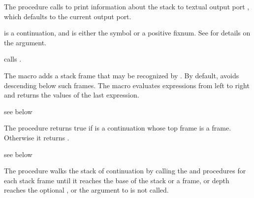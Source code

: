 The  procedure calls  to print information
about the stack to textual output port , which defaults to the current
output port.

 is a continuation, and  is either the symbol
 or a positive fixnum.
See \hyperlink{walk-stack}{} for details on the
 argument.

 calls .

\begin{syntax}
\end{syntax}
\expandsto{}

The  macro adds a stack frame that may be recognized
by .
By default,  avoids descending below such frames.
The  macro evaluates expressions   \etc from
left to right and returns the values of the last expression.

\begin{procedure}
\end{procedure}
\returns{} see below

The  procedure returns true if  is a continuation
whose top frame is a  frame.
Otherwise it returns .

\begin{procedure}
\end{procedure}
\returns{} see below

The  procedure walks the stack of continuation 
by calling the  and  procedures for each
stack frame until
it reaches the base of the stack or a  frame,
or depth reaches the optional ,
or the  argument to  is not called.

